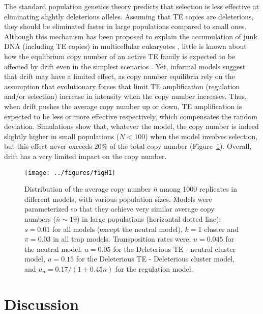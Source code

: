 \documentclass[10pt,a4paper]{article}
\begin{document}
The standard population genetics theory predicts that selection is less effective at eliminating slightly deleterious alleles. Assuming that TE copies are deleterious, they should be eliminated faster in large populations compared to small ones. Although this mechanism has been proposed to explain the accumulation of junk DNA (including TE copies) in multicellular eukaryotes \citep{LC03}, little is known about how the equlibrium copy number of an active TE family is expected to be affected by drift even in the simplest scenarios \citep{CC83}. Yet, informal models suggest that drift may have a limited effect, as copy number equilibria rely on the assumption that evolutionary forces that limit TE amplification (regulation and/or selection) increase in intensity when the copy number increases. Thus, when drift pushes the average copy number up or down, TE amplification is expected to be less or more effective respectively, which compensates the random deviation. Simulations show that, whatever the model, the copy number is indeed slightly higher in small populations ($N < 100$) when the model involves selection, but this effect never exceeds 20\% of the total copy number (Figure~\ref{fig:figH1}). Overall, drift has a very limited impact on the copy number. 

\begin{figure}
\begin{adjustwidth}{-1in}{0in}
\begin{center}
	\texttt{[image: ../figures/figH1]}
\caption{\label{fig:figH1} Distribution of the average copy number $\bar n$ among 1000 replicates in different models, with various population sizes. Models were parameterized so that they achieve very similar average copy numbers ($\bar n \sim 19$) in large populations (horizontal dotted line): $s=0.01$ for all models (except the neutral model), $k=1$ cluster and $\pi =0.03$ in all trap models. Transposition rates were: $u=0.045$ for the neutral model, $u=0.05$ for the Deleterious TE - neutral cluster model, $u=0.15$ for the Deleterious TE - Deleterious cluster model, and $u_n=0.17/(1+0.45 n)$ for the regulation model. }
\end{center}\end{adjustwidth}
\end{figure}


\section{Discussion}
\end{document}
